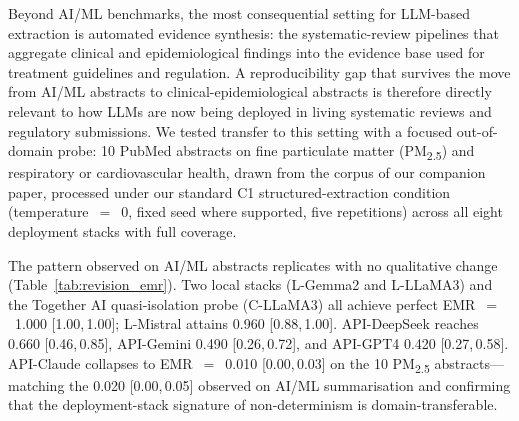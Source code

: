 \documentclass[sn-nature]{sn-jnl}
\begin{document}
Beyond AI/ML benchmarks, the most consequential setting for LLM-based extraction is automated evidence synthesis: the systematic-review pipelines that aggregate clinical and epidemiological findings into the evidence base used for treatment guidelines and regulation.
A reproducibility gap that survives the move from AI/ML abstracts to clinical-epidemiological abstracts is therefore directly relevant to how LLMs are now being deployed in living systematic reviews and regulatory submissions.
We tested transfer to this setting with a focused out-of-domain probe: 10 PubMed abstracts on fine particulate matter (PM\textsubscript{2.5}) and respiratory or cardiovascular health, drawn from the corpus of our companion paper\cite{rover2026evidence}, processed under our standard C1 structured-extraction condition (temperature~$=$~0, fixed seed where supported, five repetitions) across all eight deployment stacks with full coverage.

The pattern observed on AI/ML abstracts replicates with no qualitative change (Table~\ref{tab:revision_emr}).
Two local stacks (L-Gemma2 and L-LLaMA3) and the Together AI quasi-isolation probe (C-LLaMA3) all achieve perfect EMR~$=$~1.000 [1.00,\,1.00]; L-Mistral attains 0.960 [0.88,\,1.00].
API-DeepSeek reaches 0.660 [0.46,\,0.85], API-Gemini 0.490 [0.26,\,0.72], and API-GPT4 0.420 [0.27,\,0.58].
API-Claude collapses to EMR~$=$~0.010 [0.00,\,0.03] on the 10 PM\textsubscript{2.5} abstracts---matching the 0.020 [0.00,\,0.05] observed on AI/ML summarisation and confirming that the deployment-stack signature of non-determinism is domain-transferable.
\end{document}
